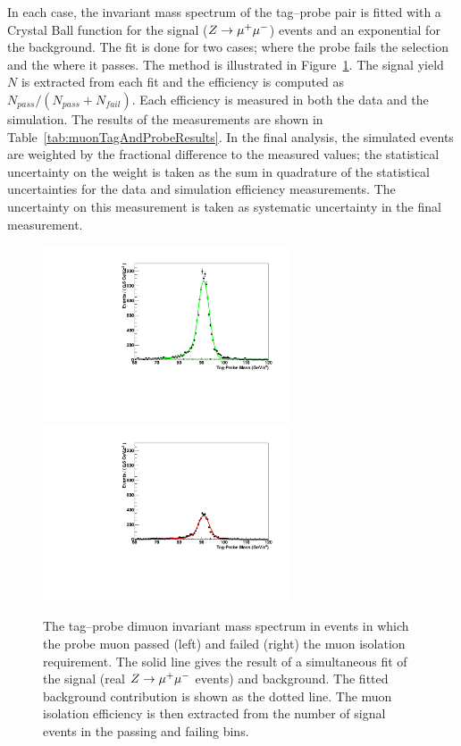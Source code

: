In each case, the invariant mass spectrum of the tag--probe pair is fitted with
a Crystal Ball function for the signal ($\mbox{\ensuremath{Z\to\mu^+\mu^-}}$) events and an
exponential for the background.  The fit is done for two cases; where the probe
fails the selection and the where it passes.  The method is illustrated in
Figure~\ref{fig:TagAndProbeFits}.  The signal yield $N$ is extracted from each
fit and the efficiency is computed as $N_{pass}/(N_{pass} + N_{fail})$.  Each
efficiency is measured in both the data and the simulation. The results of the
measurements are shown in Table~\ref{tab:muonTagAndProbeResults}. In the final
analysis, the simulated events are weighted by the fractional difference to the
measured values; the statistical uncertainty on the weight is taken as the sum
in quadrature of the statistical uncertainties for the data and simulation
efficiency measurements.  The uncertainty on this measurement is taken as
systematic uncertainty in the final measurement.
\begin{figure}[t]
\begin{center}
\includegraphics*[height=52mm]{corrections_chapter/tag_probe_data/plot_0.pdf}
\includegraphics*[height=52mm]{corrections_chapter/tag_probe_data/plot_1.pdf}
\caption[Tag--probe muon isolation method]{The tag--probe dimuon invariant mass
spectrum in events in which the probe muon passed (left) and failed (right) the
muon isolation requirement.  The solid line gives the result of a simultaneous fit
of the signal (real $Z\to\mu^+\mu^-$ events) and background.  The fitted background
contribution is shown as the dotted line.  The muon isolation efficiency is then
extracted from the number of signal events in the passing and failing bins.}
\label{fig:TagAndProbeFits}
\end{center}
\end{figure} 

